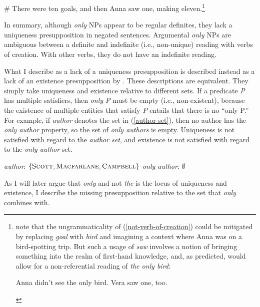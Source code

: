 \begin{exe}
	\ex \label{not-verb-of-creation} \# There were ten goals, and then Anna saw one, making eleven.\footnote{\citeauthor{cb2015} note that the ungrammaticality of (\ref{not-verb-of-creation}) could be mitigated by replacing \textit{goal} with \textit{bird} and imagining a context where Anna was on a bird-spotting trip. But such a usage of \textit{saw} involves a notion of bringing something into the realm of first-hand knowledge, and, as predicted, would allow for a non-referential reading of \textit{the only bird}: \begin{exe} \ex Anna didn't see the only bird. Vera saw one, too. \end{exe} }
\end{exe}

In summary, although \textit{only} NPs appear to be regular definites, they lack a uniqueness presupposition in negated sentences. Argumental \textit{only} NPs are ambiguous between a definite and indefinite (i.e., non-unique) reading with verbs of creation. With other verbs, they do not have an indefinite reading.

What I describe as a lack of a uniqueness presupposition is described instead as a lack of an existence presupposition by \citet{cb2015}. These descriptions are equivalent. They simply take uniqueness and existence relative to different sets. If a predicate \textit{P} has multiple satisfiers, then \textit{only P} must be empty (i.e., non-existent), because the existence of multiple entities that satisfy \textit{P} entails that there is no ``only P.'' For example, if \textit{author} denotes the set in (\ref{author-set}), then no author has the \textit{only author} property, so the set of \textit{only authors} is empty. Uniqueness is not satisfied with regard to the \textit{author set}, and existence is not satisfied with regard to the \textit{only author} set.

\begin{exe}
	\ex \label{author-set} \textit{author}: $\lbrace \textsc{Scott}, \textsc{Macfarlane}, \textsc{Campbell} \rbrace$
	\ex \textit{only author}: $\emptyset$
\end{exe}

As I will later argue that \textit{only} and not \textit{the} is the locus of uniqueness and existence, I describe the missing presupposition relative to the set that \textit{only} combines with.